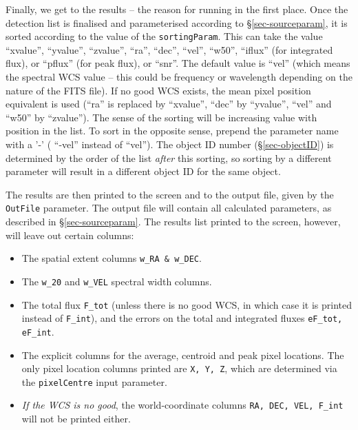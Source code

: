 
\label{sec-results}

Finally, we get to the results -- the reason for running \duchamp in
the first place. Once the detection list is finalised and
parameterised according to \S\ref{sec-sourceparam}, it is sorted
according to the value of the \texttt{sortingParam}. This can take the
value ``xvalue'', ``yvalue'', ``zvalue'', ``ra'', ``dec'', ``vel'',
``w50'', ``iflux'' (for integrated flux), or ``pflux'' (for peak
flux), or ``snr''. The default value is ``vel'' (which means the
spectral WCS value -- this could be frequency or wavelength depending
on the nature of the FITS file). If no good WCS exists, the mean pixel
position equivalent is used (``ra'' is replaced by ``xvalue'', ``dec''
by ``yvalue'', ``vel'' and ``w50'' by ``zvalue''). The sense of the
sorting will be increasing value with position in the list. To sort in
the opposite sense, prepend the parameter name with a '-' (\eg
``-vel'' instead of ``vel''). The object ID number
(\S\ref{sec-objectID}) is determined by the order of the list
\emph{after} this sorting, so sorting by a different parameter will
result in a different object ID for the same object.

The results are then printed to the screen and to the output file,
given by the \texttt{OutFile} parameter. The output file will contain
all calculated parameters, as described in
\S\ref{sec-sourceparam}. The results list printed to the screen,
however, will leave out certain columns: 
\begin{itemize}
\item The spatial extent columns \texttt{w\_RA \& w\_DEC}.
\item The \texttt{w\_20} and \texttt{w\_VEL} spectral width columns.
\item The total flux \texttt{F\_tot} (unless there is no good WCS, in
  which case it is printed instead of \texttt{F\_int}), and the errors
  on the total and integrated fluxes \texttt{eF\_tot, eF\_int}.
\item The explicit columns for the average, centroid and peak pixel
  locations. The only pixel location columns printed are \texttt{X, Y,
  Z}, which are determined via the \texttt{pixelCentre} input
parameter.
\item \textit{If the WCS is no good}, the world-coordinate columns
  \texttt{RA, DEC, VEL, F\_int} will not be printed either.
\end{itemize}

